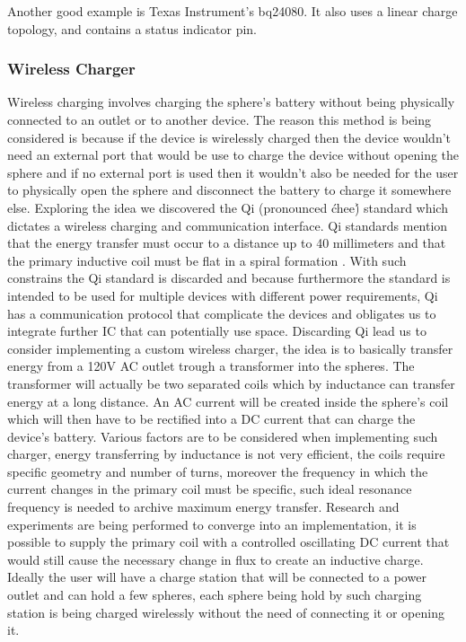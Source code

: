 Another good example is Texas Instrument's bq24080. It also uses a linear charge topology, and contains a status indicator pin.
\subsubsection{Wireless Charger}
Wireless charging involves charging the sphere's battery without being physically connected to an outlet or to another device. The reason this method is being considered is because if the device is wirelessly charged then the device wouldn't need an external port that would be use to charge the device without opening the sphere and if no external port is used then it wouldn't also be needed for the user to physically open the sphere and disconnect the battery to charge it somewhere else. Exploring the idea we discovered the Qi (pronounced \'chee\') standard which dictates a wireless charging and communication interface. Qi standards mention that the energy transfer must occur to a distance up to 40 millimeters and that the primary inductive coil must be flat in a spiral formation \cite{QiStandard}. With such constrains the Qi standard is discarded and because furthermore the standard is intended to be used for multiple devices with different power requirements, Qi has a communication protocol that complicate the devices and obligates us to integrate further IC that can potentially use space. Discarding Qi lead us to consider implementing a custom wireless charger, the idea is to basically transfer energy from a 120V AC outlet trough a transformer into the spheres. The transformer will actually be two separated coils which by inductance can transfer energy at a long distance. An AC current will be created inside the sphere's coil which will then have to be rectified into a DC current that can charge the device's battery. Various factors are to be considered when implementing such charger, energy transferring by inductance is not very efficient, the coils require specific geometry and number of turns, moreover the frequency in which the current changes in the primary coil must be specific, such ideal resonance frequency is needed to archive maximum energy transfer. Research and experiments are being performed to converge into an implementation, it is possible to supply the primary coil with a controlled oscillating DC current that would still cause the necessary change in flux to create an inductive charge. Ideally the user will have a charge station that will be connected to a power outlet and can hold a few spheres, each sphere being hold by such charging station is being charged wirelessly without the need of connecting it or opening it. 
